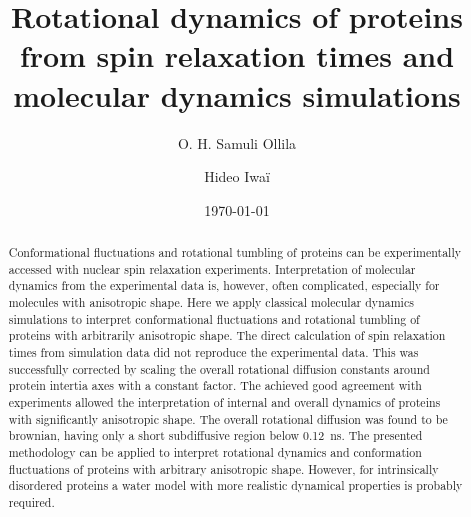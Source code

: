 \documentclass[pre,aps,floatfix,authordate1-4,twocolumn]{revtex4-1}
\begin{document}

\title{Rotational dynamics of proteins from spin relaxation times and molecular dynamics simulations} %



\author{O. H. Samuli Ollila}

\author{Hideo Iwa\"i}


\date{\today}

\begin{abstract}
  Conformational fluctuations and rotational tumbling of proteins can be experimentally accessed
  with nuclear spin relaxation experiments. Interpretation of molecular dynamics from the
  experimental data is, however, often complicated, especially for molecules with anisotropic
  shape. Here we apply classical molecular dynamics simulations to interpret conformational fluctuations
  and rotational tumbling of proteins with arbitrarily anisotropic shape. The direct calculation
  of spin relaxation times from simulation data did not reproduce the experimental data.
  This was successfully corrected by scaling the overall rotational diffusion constants around
  protein intertia axes with a constant factor. The achieved good agreement with experiments
  allowed the interpretation of internal and overall dynamics of proteins with significantly
  anisotropic shape. The overall rotational diffusion was found to be brownian, having only a
  short subdiffusive region below 0.12~ns. The presented methodology can be applied to
  interpret rotational dynamics and conformation fluctuations of proteins with arbitrary anisotropic
  shape. However, for intrinsically disordered proteins a water model with more realistic
  dynamical properties is probably required.
\end{abstract}
\end{document}
